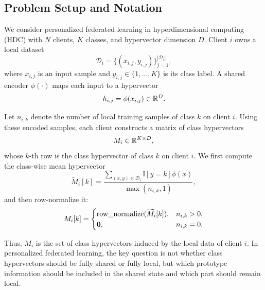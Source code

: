 \documentclass[lettersize,journal]{IEEEtran}
\newcommand{\rev}[1]{#1}
\begin{document}
\subsection{Problem Setup and Notation}
\label{subsec:problem_setup}

We consider personalized federated learning in hyperdimensional computing (HDC) with $N$ clients, $K$ classes, and hypervector dimension $D$.
Client $i$ owns a local dataset
\begin{equation}
\mathcal{D}_i=\{(x_{i,j},y_{i,j})\}_{j=1}^{|\mathcal{D}_i|},
\end{equation}
where $x_{i,j}$ is an input sample and $y_{i,j}\in\{1,\dots,K\}$ is its class label.
A shared encoder $\phi(\cdot)$ maps each input to a hypervector
\begin{equation}
\label{eq:client_encoded_hv}
h_{i,j}=\phi(x_{i,j}) \in \mathbb{R}^D.
\end{equation}

Let $n_{i,k}$ denote the number of local training samples of class $k$ on client $i$.
Using these encoded samples, each client constructs a matrix of class hypervectors
\begin{equation}
M_i \in \mathbb{R}^{K \times D},
\end{equation}
whose $k$-th row is the class hypervector of class $k$ on client $i$. We first compute the class-wise mean hypervector
\begin{equation}
\label{eq:proto_raw}
\widetilde{M}_i[k]
=
\frac{\sum_{(x,y)\in \mathcal{D}_i}\mathbb{I}[y=k]\phi(x)}
{\max(n_{i,k},1)},
\end{equation}
and then row-normalize it:
\begin{equation}
\label{eq:proto_norm}
M_i[k]
=
\begin{cases}
\operatorname{row\_normalize}(\widetilde{M}_i[k]), & n_{i,k}>0,\\
\mathbf{0}, & n_{i,k}=0.
\end{cases}
\end{equation}

Thus, $M_i$ is the set of class hypervectors induced by the local data of client $i$.
In personalized federated learning, the key question is not whether class hypervectors should be fully shared or fully local, but which prototype information should \rev{be included in the shared state} and which part should \rev{remain local}.
\end{document}

